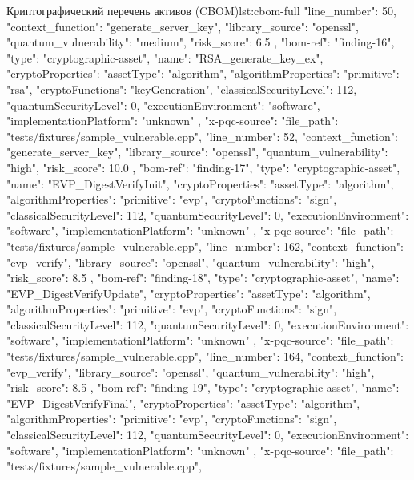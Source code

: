 \documentclass{itmo-vkr}
\begin{document}
\begin{itmolisting}[JSON]{Криптографический перечень активов (CBOM)}{lst:cbom-full}
{{{				"line_number": 50,
				"context_function": "generate_server_key",
				"library_source": "openssl",
				"quantum_vulnerability": "medium",
				"risk_score": 6.5
			}
		},
		{
			"bom-ref": "finding-16",
			"type": "cryptographic-asset",
			"name": "RSA_generate_key_ex",
			"cryptoProperties": {
				"assetType": "algorithm",
				"algorithmProperties": {
					"primitive": "rsa",
					"cryptoFunctions": "keyGeneration",
					"classicalSecurityLevel": 112,
					"quantumSecurityLevel": 0,
					"executionEnvironment": "software",
					"implementationPlatform": "unknown"
				}
			},
			"x-pqc-source": {
				"file_path": "tests/fixtures/sample_vulnerable.cpp",
				"line_number": 52,
				"context_function": "generate_server_key",
				"library_source": "openssl",
				"quantum_vulnerability": "high",
				"risk_score": 10.0
			}
		},
		{
			"bom-ref": "finding-17",
			"type": "cryptographic-asset",
			"name": "EVP_DigestVerifyInit",
			"cryptoProperties": {
				"assetType": "algorithm",
				"algorithmProperties": {
					"primitive": "evp",
					"cryptoFunctions": "sign",
					"classicalSecurityLevel": 112,
					"quantumSecurityLevel": 0,
					"executionEnvironment": "software",
					"implementationPlatform": "unknown"
				}
			},
			"x-pqc-source": {
				"file_path": "tests/fixtures/sample_vulnerable.cpp",
				"line_number": 162,
				"context_function": "evp_verify",
				"library_source": "openssl",
				"quantum_vulnerability": "high",
				"risk_score": 8.5
			}
		},
		{
			"bom-ref": "finding-18",
			"type": "cryptographic-asset",
			"name": "EVP_DigestVerifyUpdate",
			"cryptoProperties": {
				"assetType": "algorithm",
				"algorithmProperties": {
					"primitive": "evp",
					"cryptoFunctions": "sign",
					"classicalSecurityLevel": 112,
					"quantumSecurityLevel": 0,
					"executionEnvironment": "software",
					"implementationPlatform": "unknown"
				}
			},
			"x-pqc-source": {
				"file_path": "tests/fixtures/sample_vulnerable.cpp",
				"line_number": 164,
				"context_function": "evp_verify",
				"library_source": "openssl",
				"quantum_vulnerability": "high",
				"risk_score": 8.5
			}
		},
		{
			"bom-ref": "finding-19",
			"type": "cryptographic-asset",
			"name": "EVP_DigestVerifyFinal",
			"cryptoProperties": {
				"assetType": "algorithm",
				"algorithmProperties": {
					"primitive": "evp",
					"cryptoFunctions": "sign",
					"classicalSecurityLevel": 112,
					"quantumSecurityLevel": 0,
					"executionEnvironment": "software",
					"implementationPlatform": "unknown"
				}
			},
			"x-pqc-source": {
				"file_path": "tests/fixtures/sample_vulnerable.cpp",
}}}
\end{itmolisting}
\end{document}
